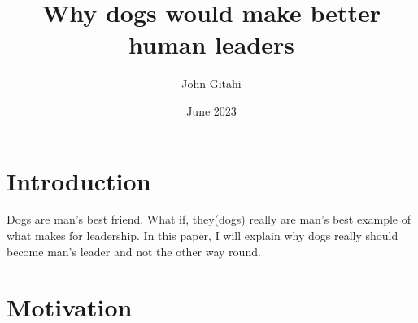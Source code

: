 \documentclass{article}
\title{Why dogs would make better human leaders}
\author{John Gitahi}
\date{June 2023}
\begin{document}
\maketitle

\section{Introduction}
Dogs are man's best friend. What if, they(dogs) really are man's best example of what makes for leadership. In this paper, I will explain why dogs really should become man's leader and not the other way round.

\section{Motivation}
\end{document}
